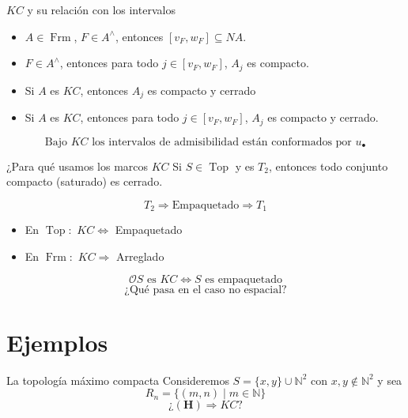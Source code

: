 \documentclass[compress,12pt]{beamer}
\DeclareMathOperator{\Frm}{Frm}
\DeclareMathOperator{\Top}{Top}
\begin{document}
\begin{frame}{$KC$ y su relación con los intervalos}
\begin{itemize}
    \item $A\in \Frm$, $F\in A^\wedge$, entonces $[v_F, w_F]\subseteq NA$.
    \item $F\in A^\wedge$, entonces para todo $j\in [v_F, w_F]$, $A_j$ es compacto. 
    \item<2-> Si $A$ es $KC$, entonces $A_j$ es compacto y cerrado
    \item<3-> Si $A$ es $KC$, entonces para todo $j\in [v_F, w_F]$, $A_j$ es compacto y cerrado.
\end{itemize}
\[
\mbox{Bajo }KC\mbox{ los intervalos de admisibilidad están conformados por }u_\bullet
\]
\end{frame}

\begin{frame}{¿Para qué usamos los marcos $KC$}
Si $S\in \Top$ y es $T_2$, entonces todo conjunto compacto (saturado) es cerrado.

\[
T_2\Rightarrow \mbox{Empaquetado}\Rightarrow T_1
\]

\begin{itemize}
    \item<3-> En $\Top:$ $KC\Leftrightarrow$ Empaquetado
    \item<4-> En $\Frm:$ $KC\Rightarrow$ Arreglado
\end{itemize}

\[
\mathcal{O}S\mbox{ es }KC\Leftrightarrow S \mbox{ es empaquetado}
\]
\[
\mbox{¿Qué pasa en el caso no espacial?}
\]
\end{frame}

\section{Ejemplos}
\begin{frame}{La topología máximo compacta}
Consideremos $S=\{x,y\}\cup \mathbb{N}^2$ con $x,y\notin \mathbb{N}^2$ y sea 
\[
R_n=\{(m,n)\mid m\in \mathbb{N}\}
\]
\[
¿\mathbf{(H)}\Rightarrow KC?
\]
\end{frame}
\end{document}
